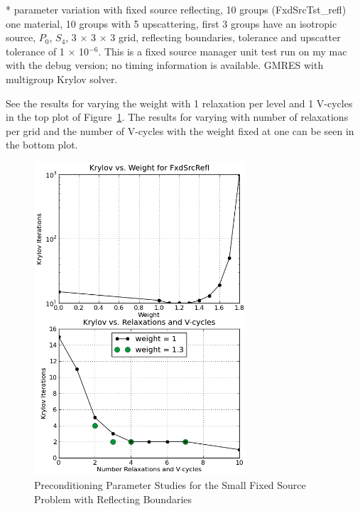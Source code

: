 * parameter variation with fixed source reflecting, 10 groups (FxdSrcTst\_refl)
one material, 10 groups with 5 upscattering, first 3 groups have an isotropic source, $P_{0}$, $S_{4}$, 3 $\times$ 3 $\times$ 3 grid, reflecting boundaries, tolerance and upscatter tolerance of 1 $\times$ 10$^{-6}$. This is a fixed source manager unit test run on my mac with the debug version; no timing information is available. GMRES with multigroup Krylov solver. 

See the results for varying the weight with 1 relaxation per level and 1 V-cycles in the top plot of Figure~\ref{fig:FxdSrcRefl}. The results for varying with number of relaxations per grid and the number of V-cycles with the weight fixed at one can be seen in the bottom plot. 
%
\begin{figure}[!ht]
    \begin{center}
      \includegraphics [width=0.7\textwidth, height=0.8\textheight] {FxdSrcRefl}
   \end{center}
   \caption{Preconditioning Parameter Studies for the Small Fixed Source Problem with Reflecting Boundaries}
   \label{fig:FxdSrcRefl}
\end{figure}


